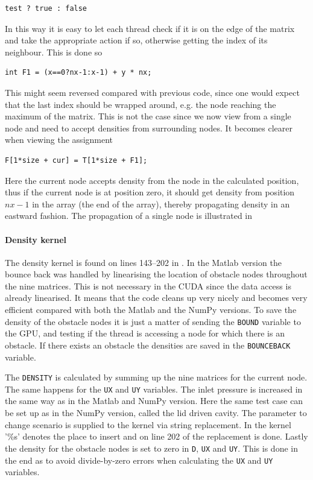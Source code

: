 \begin{verbatim}
test ? true : false
\end{verbatim}

In this way it is easy to let each thread check if it is on the edge of the matrix and take the appropriate action if so, otherwise getting the index of its neighbour. This is done so

\begin{verbatim}
int F1 = (x==0?nx-1:x-1) + y * nx;
\end{verbatim}

This might seem reversed compared with previous code, since one would expect that the last index should be wrapped around, e.g. the node reaching the maximum of the matrix. This is not the case since we now view from a single node and need to accept densities from surrounding nodes. It becomes clearer when viewing the assignment

\begin{verbatim}
F[1*size + cur] = T[1*size + F1];
\end{verbatim}

Here the current node accepts density from the node in the calculated position, thus if the current node is at position zero, it should get density from position $nx-1$ in the array (the end of the array), thereby propagating density in an eastward fashion. The propagation of a single node is illustrated in 


\paragraph{Density kernel}
The density kernel is found on lines 143--202 in . In the Matlab version the bounce back was handled by linearising the location of obstacle nodes throughout the nine matrices. This is not necessary in the CUDA since the data access is already linearised. It means that the code cleans up very nicely and becomes very efficient compared with both the Matlab and the NumPy versions. To save the density of the obstacle nodes it is just a matter of sending the \texttt{BOUND} variable to the GPU, and testing if the thread is accessing a node for which there is an obstacle. If there exists an obstacle the densities are saved in the \texttt{BOUNCEBACK} variable.

The \texttt{DENSITY} is calculated by summing up the nine matrices for the current node. The same happens for the \texttt{UX} and \texttt{UY} variables. The inlet pressure is increased in the same way as in the Matlab and NumPy version. Here the same test case can be set up as in the NumPy version, called the lid driven cavity. The parameter to change scenario is supplied to the kernel via string replacement. In the kernel '\%s' denotes the place to insert and on line 202 of  the replacement is done. Lastly the density for the obstacle nodes is set to zero in \texttt{D}, \texttt{UX} and \texttt{UY}. This is done in the end as to avoid divide-by-zero errors when calculating the \texttt{UX} and \texttt{UY} variables.


